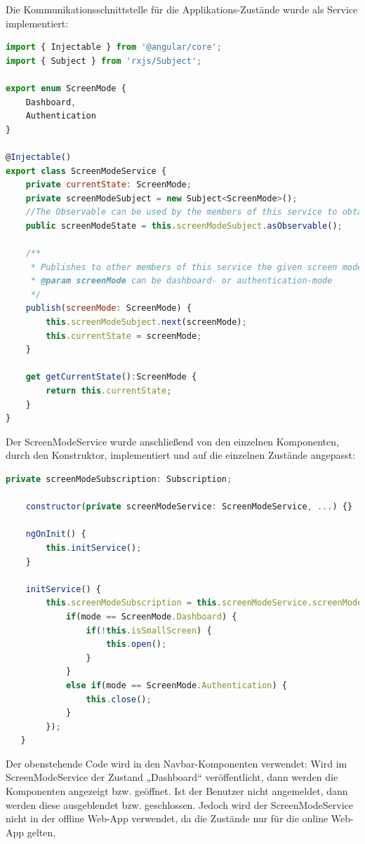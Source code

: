 \clearpage
Die Kommunikationsschnittstelle für die Applikations-Zustände wurde als Service implementiert:
\lstset{escapechar=?,style=customjava}
\begin{lstlisting}[language=javascript, caption=Kommunikationsschnittstelle der Layout-Komponenten]
import { Injectable } from '@angular/core';
import { Subject } from 'rxjs/Subject';

export enum ScreenMode {
    Dashboard,
    Authentication
}

@Injectable()
export class ScreenModeService {
    private currentState: ScreenMode;
    private screenModeSubject = new Subject<ScreenMode>();
    //The Observable can be used by the members of this service to obtain the published modes
    public screenModeState = this.screenModeSubject.asObservable();

    /**
     * Publishes to other members of this service the given screen mode
     * @param screenMode can be dashboard- or authentication-mode
     */
    publish(screenMode: ScreenMode) {
        this.screenModeSubject.next(screenMode);
        this.currentState = screenMode;
    }

    get getCurrentState():ScreenMode {
        return this.currentState;
    }
}
\end{lstlisting}
\lstset{escapechar=@,style=customjava}
\clearpage
Der ScreenModeService wurde anschließend von den einzelnen Komponenten, durch den Konstruktor, implementiert und auf die einzelnen Zustände angepasst:
\lstset{escapechar=?,style=customjava}
\begin{lstlisting}[language=javascript, caption=ScreenModeService ist zuständig für die Webapp-Zustände]
    private screenModeSubscription: Subscription;    

    constructor(private screenModeService: ScreenModeService, ...) {}

    ngOnInit() {
        this.initService();
    }

    initService() {
        this.screenModeSubscription = this.screenModeService.screenModeState.subscribe((mode) => {
            if(mode == ScreenMode.Dashboard) {
                if(!this.isSmallScreen) {
                    this.open();
                }
            }
            else if(mode == ScreenMode.Authentication) {
                this.close();
            }
        });
   }
\end{lstlisting}
\lstset{escapechar=@,style=customjava}

Der obenstehende Code wird in den Navbar-Komponenten verwendet: Wird im ScreenModeService der Zustand „Dashboard“ veröffentlicht, dann werden die Komponenten angezeigt bzw. geöffnet. Ist der Benutzer nicht angemeldet, dann werden diese ausgeblendet bzw. geschlossen. Jedoch wird der ScreenModeService nicht in der offline Web-App verwendet, da die Zustände nur für die online Web-App gelten.

